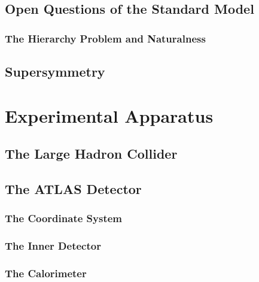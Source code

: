 \documentclass[10pt,twoside,cucitura,classica,english,openany]{toptesi}
\begin{document}
\section{Open Questions of the Standard Model}
\label{sec:open-quest-stand}



\subsection{The Hierarchy Problem and Naturalness}
\label{sec:hier-probl-natur}



\section{Supersymmetry}
\label{sec:supersymmetry}



\chapter{Experimental Apparatus}
\label{cha:exper-appar}

\section{The Large Hadron Collider}
\label{sec:large-hadr-coll}



\section{The ATLAS Detector}
\label{sec:atlas-detector}



\subsection{The Coordinate System}
\label{sec:coordinate-system}



\subsection{The Inner Detector}
\label{sec:inner-detector}



\subsection{The Calorimeter}
\label{sec:calorimeters}
\end{document}
